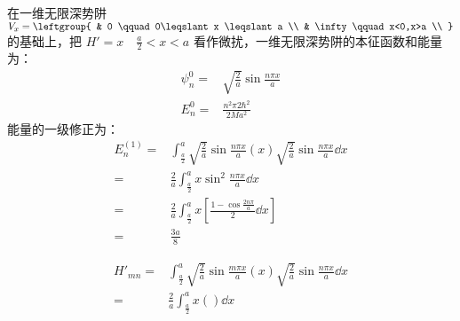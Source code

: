 \subsection{ }
在一维无限深势阱 $V_{x} = \leftgroup{
    & 0 \qquad 0\leqslant x \leqslant a \\
    & \infty \qquad x<0,x>a \\
}$ 的基础上，把 $H' = x \quad \frac{a}{2} < x < a $ 看作微扰，一维无限深势阱的本征函数和能量为：\\
\begin{align}
\psi^{0}_{n}=& \sqrt{\frac{2}{a}} \sin{\frac{n\pi x}{a}}\\
E^{0}_{n}=& \frac{n^{2}\pi{2}\hbar^{2}}{2Ma^2}
\end{align}
能量的一级修正为：\\
\begin{equation}
\begin{aligned}
E^{(1)}_{n}=&\int^{a}_{\frac{a}{2}} \sqrt{\frac{2}{a}} \sin{\frac{n\pi x}{a}}(x)\sqrt{\frac{2}{a}} \sin{\frac{n\pi x}{a}} \dd{x} \\
=& \frac{2}{a} \int^{a}_{\frac{a}{2}} x\sin^{2}{\frac{n\pi x}{a}} \dd{x} \\
=& \frac{2}{a}\int^{a}_{\frac{a}{2}} x[\frac{1-\cos{\frac{2n \pi}{a}}}{2}\dd x] \\
=& \frac{3a}{8}
\end{aligned}
\end{equation}

\begin{equation}
\begin{aligned}
H'_{mn} =& \int^{a}_{\frac{a}{2}} \sqrt{\frac{2}{a}} \sin{\frac{m \pi x}{a}} (x) \sqrt{\frac{2}{a} }\sin{\frac{n \pi x}{a}} \dd x \\
=& \frac{2}{a} \int^{a}_{\frac{a}{2}} x() \dd x \\
\end{aligned}
\end{equation}
